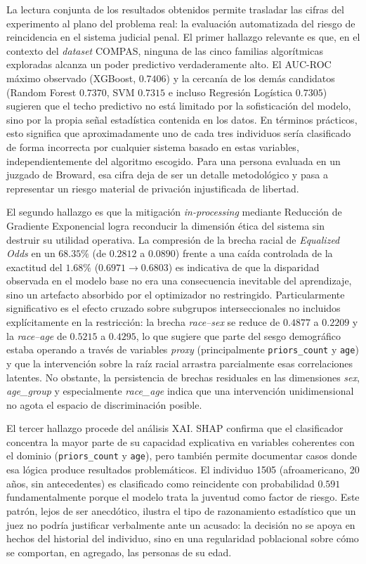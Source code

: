 \documentclass[11pt,a4paper]{article}
\begin{document}
La lectura conjunta de los resultados obtenidos permite trasladar las cifras del experimento al plano del problema real: la evaluación automatizada del riesgo de reincidencia en el sistema judicial penal. El primer hallazgo relevante es que, en el contexto del \textit{dataset} COMPAS, ninguna de las cinco familias algorítmicas exploradas alcanza un poder predictivo verdaderamente alto. El AUC-ROC máximo observado (XGBoost, $0.7406$) y la cercanía de los demás candidatos (Random Forest $0.7370$, SVM $0.7315$ e incluso Regresión Logística $0.7305$) sugieren que el techo predictivo no está limitado por la sofisticación del modelo, sino por la propia señal estadística contenida en los datos. En términos prácticos, esto significa que aproximadamente uno de cada tres individuos sería clasificado de forma incorrecta por cualquier sistema basado en estas variables, independientemente del algoritmo escogido. Para una persona evaluada en un juzgado de Broward, esa cifra deja de ser un detalle metodológico y pasa a representar un riesgo material de privación injustificada de libertad.

El segundo hallazgo es que la mitigación \textit{in-processing} mediante Reducción de Gradiente Exponencial logra reconducir la dimensión ética del sistema sin destruir su utilidad operativa. La compresión de la brecha racial de \textit{Equalized Odds} en un $68.35\%$ (de $0.2812$ a $0.0890$) frente a una caída controlada de la exactitud del $1.68\%$ ($0.6971 \to 0.6803$) es indicativa de que la disparidad observada en el modelo base no era una consecuencia inevitable del aprendizaje, sino un artefacto absorbido por el optimizador no restringido. Particularmente significativo es el efecto cruzado sobre subgrupos interseccionales no incluidos explícitamente en la restricción: la brecha \textit{race--sex} se reduce de $0.4877$ a $0.2209$ y la \textit{race--age} de $0.5215$ a $0.4295$, lo que sugiere que parte del sesgo demográfico estaba operando a través de variables \textit{proxy} (principalmente \texttt{priors\_count} y \texttt{age}) y que la intervención sobre la raíz racial arrastra parcialmente esas correlaciones latentes. No obstante, la persistencia de brechas residuales en las dimensiones \textit{sex}, \textit{age\_group} y especialmente \textit{race\_age} indica que una intervención unidimensional no agota el espacio de discriminación posible.

El tercer hallazgo procede del análisis XAI. SHAP confirma que el clasificador concentra la mayor parte de su capacidad explicativa en variables coherentes con el dominio (\texttt{priors\_count} y \texttt{age}), pero también permite documentar casos donde esa lógica produce resultados problemáticos. El individuo 1505 (afroamericano, 20 años, sin antecedentes) es clasificado como reincidente con probabilidad $0.591$ fundamentalmente porque el modelo trata la juventud como factor de riesgo. Este patrón, lejos de ser anecdótico, ilustra el tipo de razonamiento estadístico que un juez no podría justificar verbalmente ante un acusado: la decisión no se apoya en hechos del historial del individuo, sino en una regularidad poblacional sobre cómo se comportan, en agregado, las personas de su edad.
\end{document}
